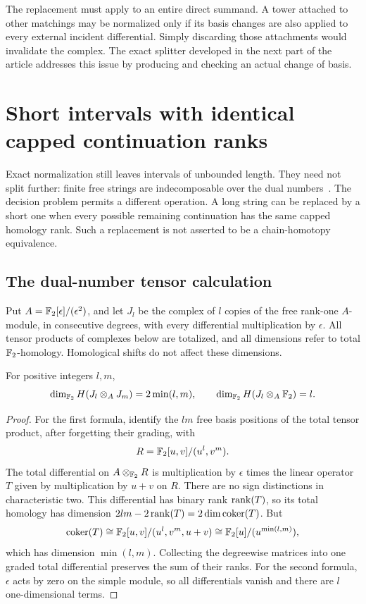 The replacement must apply to an entire direct summand. A tower attached
to other matchings may be normalized only if its basis changes are also
applied to every external incident differential. Simply discarding those
attachments would invalidate the complex. The exact splitter developed
in the next part of the article addresses this issue by producing and
checking an actual change of basis.

\section{Short intervals with identical capped continuation ranks}
\label{sec:continuation-quotient}

Exact normalization still leaves intervals of unbounded length. They
need not split further: finite free strings are indecomposable over the
dual numbers~\cite{keller}. The decision problem permits a different operation. A long
string can be replaced by a short one when every possible remaining
continuation has the same capped homology rank. Such a replacement is
not asserted to be a chain-homotopy equivalence.

\subsection{The dual-number tensor calculation}

Put $A=\mathbb F_2[\epsilon]/(\epsilon^2)$, and let $J_l$ be the complex of $l$
copies of the free rank-one $A$-module, in consecutive degrees, with every
differential multiplication by $\epsilon$. All tensor products of
complexes below are totalized, and all dimensions refer to total
$\mathbb F_2$-homology. Homological shifts do not affect these dimensions.

\begin{lemma}\label{lem:interval-tensor}
For positive integers $l,m$,
\[
 \dim_{\mathbb F_2}H(J_l\otimes_A J_m)=2\min(l,m),
 \qquad
 \dim_{\mathbb F_2}H(J_l\otimes_A\mathbb F_2)=l.
\]
\end{lemma}

\begin{proof}
For the first formula, identify the $lm$ free basis positions of the
total tensor product, after forgetting their grading, with
\[
 R=\mathbb F_2[u,v]/(u^l,v^m).
\]
The total differential on $A\otimes_{\mathbb F_2}R$ is multiplication by
$\epsilon$ times the linear operator $T$ given by multiplication by
$u+v$ on $R$. There are no sign distinctions in characteristic two.
This differential has binary rank $\operatorname{rank}(T)$, so its total homology has
dimension $2lm-2\operatorname{rank}(T)=2\dim\operatorname{coker}(T)$. But
\[
 \operatorname{coker}(T)\cong
 \mathbb F_2[u,v]/(u^l,v^m,u+v)
 \cong\mathbb F_2[u]/(u^{\min(l,m)}),
\]
which has dimension $\min(l,m)$. Collecting the degreewise matrices
into one graded total differential preserves the sum of their ranks.
For the second formula, $\epsilon$ acts by zero on the simple module,
so all differentials vanish and there are $l$ one-dimensional terms.
\end{proof}

